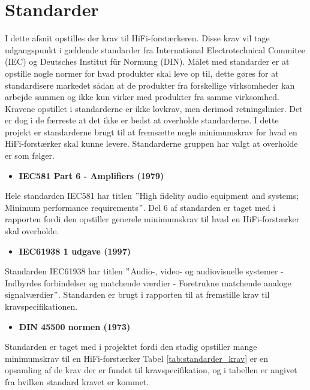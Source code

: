 \section{Standarder}
I dette afsnit opstilles der krav til HiFi-forstærkeren. Disse krav vil tage udgangspunkt i gældende standarder fra International Electrotechnical Commitee (IEC) og Deutsches Institut f\"{u}r Normung (DIN). Målet med standarder er at opstille nogle normer for hvad produkter skal leve op til, dette gøres for at standardisere markedet sådan at de produkter fra forskellige virksomheder kan arbejde sammen og ikke kun virker med produkter fra samme virksomhed. Kravene opstillet i standarderne er ikke lovkrav, men derimod retningslinier. Det er dog i de færreste at det ikke er bedst at overholde standarderne.
\newline
I dette projekt er standarderne brugt til at fremsætte nogle minimumskrav for hvad en HiFi-forstærker skal kunne levere. Standarderne gruppen har valgt at overholde er som følger.


\begin{itemize}              
\item \textbf{IEC581 Part 6 - Amplifiers (1979)}
\end{itemize} 
Hele standarden IEC581 har titlen $"$High fidelity audio equipment and systems; Minimum performance requirements$"$. Del 6 af standarden er taget med i rapporten fordi den opstiller generele minimumskrav til hvad en HiFi-forstærker skal overholde.
\begin{itemize}              
\item \textbf{IEC61938 1 udgave (1997)}                 
\end{itemize} 
Standarden IEC61938 har titlen $"$Audio-, video- og audiovisuelle systemer - Indbyrdes forbindelser og matchende værdier - Foretrukne matchende analoge signalværdier$"$. Standarden er brugt i rapporten til at fremstille krav til kravspecifikationen.
\begin{itemize}                   
\item \textbf{DIN 45500 normen (1973)}   
\end{itemize} 
Standarden er taget med i projektet fordi den stadig opstiller mange minimumskrav til en HiFi-forstærker
\newline
\newline
Tabel \ref{tab:standarder_krav} er en opsamling af de krav der er fundet til kravspecifikation, og i tabellen er angivet fra hvilken standard kravet er kommet.

